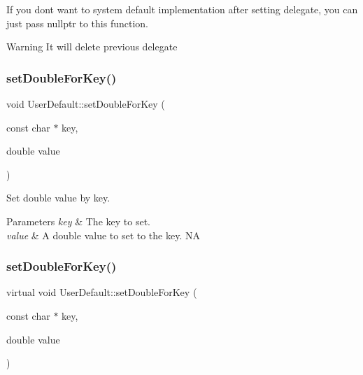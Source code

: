 If you don\textquotesingle{}t want to system default implementation after setting delegate, you can just pass nullptr to this function.

\begin{DoxyWarning}{Warning}
It will delete previous delegate 
\end{DoxyWarning}
\mbox{\label{classUserDefault_ab8d1bec4ff633818b91f69a3a23abd8d}} 
\subsubsection{\texorpdfstring{set\+Double\+For\+Key()}{setDoubleForKey()}\hspace{0.1cm}{\footnotesize\ttfamily [1/2]}}
{\footnotesize\ttfamily void User\+Default\+::set\+Double\+For\+Key (\begin{DoxyParamCaption}\item[{const char $\ast$}]{key,  }\item[{double}]{value }\end{DoxyParamCaption})\hspace{0.3cm}{\ttfamily [virtual]}}

Set double value by key. 
\begin{DoxyParams}{Parameters}
{\em key} & The key to set. \\
\hline
{\em value} & A double value to set to the key.  NA \\
\hline
\end{DoxyParams}
\mbox{\label{classUserDefault_a653f3370b0d14414d5cd51e9c7b3a68a}} 
\subsubsection{\texorpdfstring{set\+Double\+For\+Key()}{setDoubleForKey()}\hspace{0.1cm}{\footnotesize\ttfamily [2/2]}}
{\footnotesize\ttfamily virtual void User\+Default\+::set\+Double\+For\+Key (\begin{DoxyParamCaption}\item[{const char $\ast$}]{key,  }\item[{double}]{value }\end{DoxyParamCaption})\hspace{0.3cm}{\ttfamily [virtual]}}

